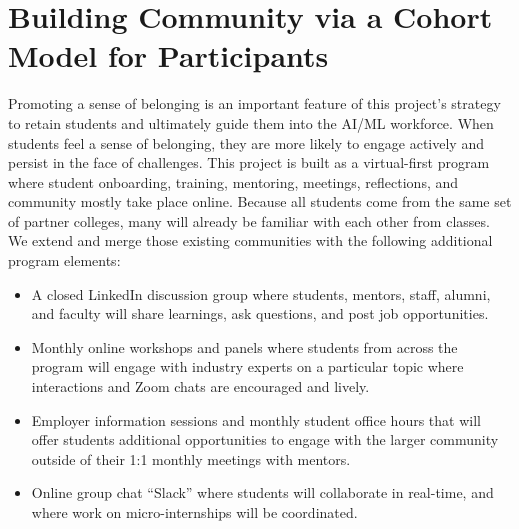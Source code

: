 \section{Building Community via a Cohort Model for Participants}

Promoting a sense of belonging is an important feature of this project's strategy to retain students and ultimately guide them into the AI/ML workforce. When students feel a sense of belonging, they are more likely to engage actively and persist in the face of challenges. This project is built as a virtual-first program where student onboarding, training, mentoring, meetings, reflections, and community mostly take place online. Because all students come from the same set of partner colleges, many will already be familiar with each other from classes. We extend and merge those existing communities with the following additional program elements:

\begin{itemize}
    \item A closed LinkedIn discussion group where students, mentors, staff, alumni, and faculty will share learnings, ask questions, and post job opportunities.
    
    \item Monthly online workshops and panels where students from across the program will engage with industry experts on a particular topic where interactions and Zoom chats are encouraged and lively.
    
    \item Employer information sessions and monthly student office hours that will offer students additional opportunities to engage with the larger community outside of their 1:1 monthly meetings with mentors.

    \item Online group chat ``Slack'' where students will collaborate in real-time, and where work on micro-internships will be coordinated.
\end{itemize}